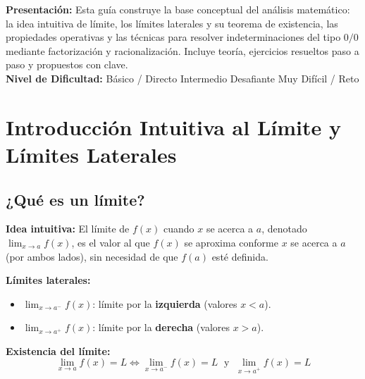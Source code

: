 \documentclass[12pt, letterpaper]{article}
\begin{document}

\vspace{4pt}
\begin{cuadroinfo}
  \small
  \textbf{Presentación:} Esta guía construye la base conceptual del análisis matemático: la idea intuitiva de límite, los límites laterales y su teorema de existencia, las propiedades operativas y las técnicas para resolver indeterminaciones del tipo $0/0$ mediante factorización y racionalización. Incluye teoría, ejercicios resueltos paso a paso y propuestos con clave.
  \\[4pt]
  \textbf{Nivel de Dificultad:}\quad
  \facil{} Básico / Directo \quad
  \medio{} Intermedio \quad
  \dificil{} Desafiante \quad
  \muyDificil{} Muy Difícil / Reto
\end{cuadroinfo}

\vspace{8pt}

\section{Introducción Intuitiva al Límite y Límites Laterales}

\subsection{¿Qué es un límite?}

\begin{cuadroteoria}
  \textbf{Idea intuitiva:} El límite de $f(x)$ cuando $x$ se acerca a $a$, denotado $\lim_{x \to a} f(x)$, es el valor al que $f(x)$ se aproxima conforme $x$ se acerca a $a$ (por ambos lados), sin necesidad de que $f(a)$ esté definida.

  \textbf{Límites laterales:}
  \begin{itemize}[leftmargin=*]
    \item $\lim_{x \to a^-} f(x)$: límite por la \textbf{izquierda} (valores $x < a$).
    \item $\lim_{x \to a^+} f(x)$: límite por la \textbf{derecha} (valores $x > a$).
  \end{itemize}

  \textbf{Existencia del límite:}
  $$\boxed{\lim_{x \to a} f(x) = L \iff \lim_{x \to a^-} f(x) = L \;\text{ y }\; \lim_{x \to a^+} f(x) = L}$$
\end{cuadroteoria}
\end{document}
